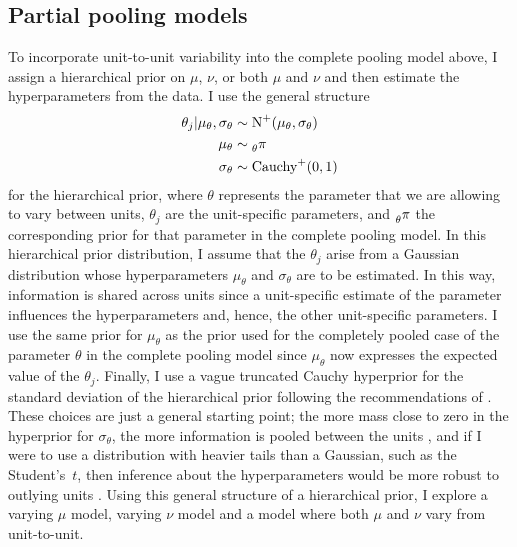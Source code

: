 \subsection{Partial pooling models} \label{subsec:partial-pooling}

To incorporate unit-to-unit variability into the complete pooling model above, I assign a hierarchical prior on $\mu$, $\nu$, or both $\mu$ and $\nu$ and then estimate the hyperparameters from the data. I use the general structure
\begin{align*}
   \theta_j| \mu_\theta, \sigma_\theta & \sim \mbox{N}^{+}(\mu_\theta, \sigma_\theta) \\
   \mu_\theta & \sim \prescript{}{\theta}{\pi}\\
   \sigma_\theta & \sim \mbox{Cauchy}^{+}(0, 1) \\
\end{align*}
for the hierarchical prior, where $\theta$ represents the parameter that we are allowing to vary between units, $\theta_j$ are the unit-specific parameters, and $\prescript{}{\theta}{\pi}$ the corresponding prior for that parameter in the complete pooling model. In this hierarchical prior distribution, I assume that the $\theta_j$ arise from a Gaussian distribution whose hyperparameters $\mu_\theta$ and $\sigma_\theta$ are to be estimated. In this way, information is shared across units since a unit-specific estimate of the parameter influences the hyperparameters and, hence, the other unit-specific parameters. I use the same prior for $\mu_\theta$ as the prior used for the completely pooled case of the parameter $\theta$ in the complete pooling model since $\mu_\theta$ now expresses the expected value of the $\theta_j$. Finally, I use a vague truncated Cauchy hyperprior for the standard deviation of the hierarchical prior following the recommendations of \citet[chap.~17]{BDA2020}. These choices are just a general starting point; the more mass close to zero in the hyperprior for $\sigma_\theta$, the more information is pooled between the units \citep{McElreath_2020}, and if I were to use a distribution with heavier tails than a Gaussian, such as the Student's~$t$, then inference about the hyperparameters would be more robust to outlying units \citep[chap.~17]{BDA2020}. Using this general structure of a hierarchical prior, I explore a varying $\mu$ model, varying $\nu$ model and a model where both $\mu$ and $\nu$ vary from unit-to-unit.

